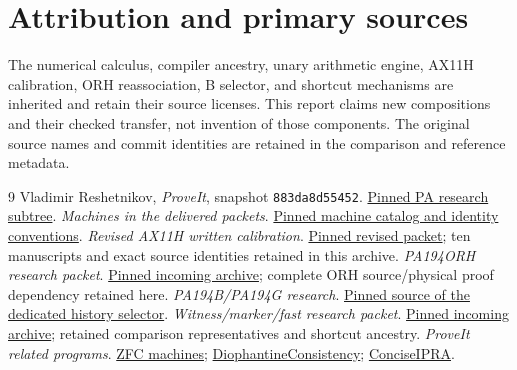 \documentclass[11pt]{article}
\begin{document}
\section*{Attribution and primary sources}
The numerical calculus, compiler ancestry, unary arithmetic engine, AX11H calibration, ORH reassociation, B selector, and shortcut mechanisms are inherited and retain their source licenses. This report claims new compositions and their checked transfer, not invention of those components. The original source names and commit identities are retained in the comparison and reference metadata.
\begin{thebibliography}{9}
Vladimir Reshetnikov, \emph{ProveIt}, snapshot \texttt{883da8d55452}. \href{https://github.com/VladimirReshetnikov/ProveIt/tree/883da8d55452ea097910ed2509a1eefc833ce292/Computability/BusyBeaver/Research/PA}{Pinned PA research subtree}.
\emph{Machines in the delivered packets}. \href{https://github.com/VladimirReshetnikov/ProveIt/blob/883da8d55452ea097910ed2509a1eefc833ce292/Computability/BusyBeaver/Research/PA/docs/MACHINES.md}{Pinned machine catalog and identity conventions}.
\emph{Revised AX11H written calibration}. \href{https://github.com/VladimirReshetnikov/ProveIt/tree/883da8d55452ea097910ed2509a1eefc833ce292/Computability/BusyBeaver/Research/PA/docs/pa194_ax11h_research_2026-11-14_2}{Pinned revised packet}; ten manuscripts and exact source identities retained in this archive.
\emph{PA194ORH research packet}. \href{https://github.com/VladimirReshetnikov/ProveIt/blob/883da8d55452ea097910ed2509a1eefc833ce292/docs/incoming/PA194ORH_research_2026-11-15.zip}{Pinned incoming archive}; complete ORH source/physical proof dependency retained here.
\emph{PA194B/PA194G research}. \href{https://github.com/VladimirReshetnikov/ProveIt/tree/883da8d55452ea097910ed2509a1eefc833ce292/Computability/BusyBeaver/Research/PA/docs/PA194B_PA194G_research_2026-11-14}{Pinned source of the dedicated history selector}.
\emph{Witness/marker/fast research packet}. \href{https://github.com/VladimirReshetnikov/ProveIt/blob/883da8d55452ea097910ed2509a1eefc833ce292/docs/incoming/pa194_research_2026-11-15.zip}{Pinned incoming archive}; retained comparison representatives and shortcut ancestry.
\emph{ProveIt related programs}. \href{https://github.com/VladimirReshetnikov/ProveIt/tree/883da8d55452ea097910ed2509a1eefc833ce292/Computability/BusyBeaver/Research/ZFC}{ZFC machines}; \href{https://github.com/VladimirReshetnikov/ProveIt/tree/883da8d55452ea097910ed2509a1eefc833ce292/Computability/DiophantineConsistency}{DiophantineConsistency}; \href{https://github.com/VladimirReshetnikov/ProveIt/tree/883da8d55452ea097910ed2509a1eefc833ce292/Logic/PrimitiveRecursiveArithmetic/ConciseIPRA}{ConciseIPRA}.
\end{thebibliography}
\end{document}

